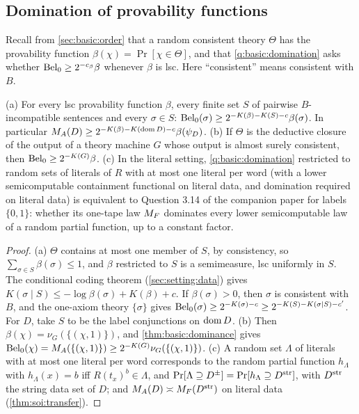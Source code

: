 \subsection{Domination of provability functions}\label{app:basic:domination}

Recall from \cref{sec:basic:order} that a random consistent theory $\Theta$ has the provability function $\beta(\chi)=\Pr[\chi\in\Theta]$, and that \cref{q:basic:domination} asks whether $\mathrm{Bel}_0\ge2^{-c_\beta}\beta$ whenever $\beta$ is lsc. Here ``consistent'' means consistent with $B$.

\begin{proposition}\label{prop:basic:domination}
(a) For every lsc provability function $\beta$, every finite set $S$ of pairwise $B$-incompatible sentences and every $\sigma\in S$: $\mathrm{Bel}_0(\sigma)\ge2^{-K(\beta)-K(S)-c}\beta(\sigma)$. In particular $M_{A}(D)\ge2^{-K(\beta)-K(\operatorname{dom} D)-c}\beta(\psi_D)$.
(b) If $\Theta$ is the deductive closure of the output of a theory machine $G$ whose output is almost surely consistent, then $\mathrm{Bel}_0\ge2^{-K(G)}\beta$.
(c) In the literal setting, \cref{q:basic:domination} restricted to random sets of literals of $R$ with at most one literal per word (with a lower semicomputable containment functional on literal data, and domination required on literal data) is equivalent to Question 3.14 of the companion paper for labels $\{0,1\}$: whether its one-tape law $M_{F}$ dominates every lower semicomputable law of a random partial function, up to a constant factor.
\end{proposition}

\begin{proof}
(a) $\Theta$ contains at most one member of $S$, by consistency, so $\sum_{\sigma\in S}\beta(\sigma)\le1$, and $\beta$ restricted to $S$ is a semimeasure, lsc uniformly in $S$. The conditional coding theorem (\cref{sec:setting:data}) gives $K(\sigma\mid S)\le-\log\beta(\sigma)+K(\beta)+c$. If $\beta(\sigma)>0$, then $\sigma$ is consistent with $B$, and the one-axiom theory $\{\sigma\}$ gives $\mathrm{Bel}_0(\sigma)\ge2^{-K(\sigma)-c}\ge2^{-K(S)-K(\sigma\mid S)-c'}$. For $D$, take $S$ to be the label conjunctions on $\operatorname{dom} D$. (b) Then $\beta(\chi)=\nu_G(\{(\chi,1)\})$, and \cref{thm:basic:dominance} gives $\mathrm{Bel}_0(\chi)=M_{A}(\{(\chi,1)\})\ge2^{-K(G)}\nu_G(\{(\chi,1)\})$. (c) A random set $\Lambda$ of literals with at most one literal per word corresponds to the random partial function $h_\Lambda$ with $h_\Lambda(x)=b$ iff $R(t_x)^b\in\Lambda$, and $\Pr[\Lambda\supseteq D^\pm]=\Pr[h_\Lambda\supseteq D^{\rm str}]$, with $D^{\rm str}$ the string data set of $D$; and $M_{A}(D)\asymp M_{F}(D^{\rm str})$ on literal data (\cref{thm:soi:transfer}).
\end{proof}

